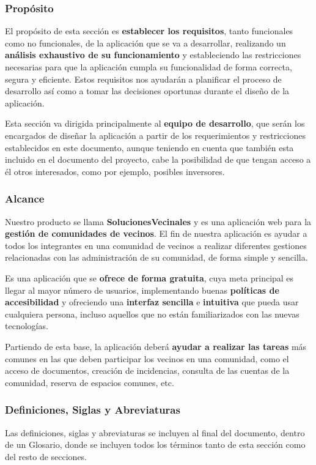 \subsubsection{Propósito}
El propósito de esta sección es \textbf{establecer los requisitos}, tanto funcionales como no funcionales, de la aplicación que se va a desarrollar, realizando un \textbf{análisis exhaustivo de su funcionamiento} y estableciendo las restricciones necesarias para que la aplicación cumpla su funcionalidad de forma correcta, segura y eficiente. Estos requisitos nos ayudarán a planificar el proceso de desarrollo así como a tomar las decisiones oportunas durante el diseño de la aplicación.

Esta sección va dirigida principalmente al \textbf{equipo de desarrollo}, que serán los encargados de diseñar la aplicación a partir de los requerimientos y restricciones establecidos en este documento, aunque teniendo en cuenta que también esta incluido en el documento del proyecto, cabe la posibilidad de que tengan acceso a él otros interesados, como por ejemplo, posibles inversores.

\subsubsection{Alcance}
Nuestro producto se llama \textbf{SolucionesVecinales} y es una aplicación web para la \textbf{gestión de comunidades de vecinos}. El fin de nuestra aplicación es ayudar a todos los integrantes en una comunidad de vecinos a realizar diferentes gestiones relacionadas con las administración de su comunidad, de forma simple y sencilla. 

Es una aplicación que se \textbf{ofrece de forma gratuita}, cuya meta principal es llegar al mayor número de usuarios, implementando buenas \textbf{políticas de accesibilidad} y ofreciendo una \textbf{interfaz sencilla} e \textbf{intuitiva} que pueda usar cualquiera persona, incluso aquellos que no están familiarizados con las nuevas tecnologías. 

Partiendo de esta base, la aplicación deberá \textbf{ayudar a realizar las tareas} más comunes en las que deben participar los vecinos en una comunidad, como el acceso de documentos, creación de incidencias, consulta de las cuentas de la comunidad,  reserva de espacios comunes, etc.

\subsubsection{Definiciones, Siglas y Abreviaturas}
Las definiciones, siglas y abreviaturas se incluyen al final del documento, dentro de un Glosario, donde se incluyen todos los términos tanto de esta sección como del resto de secciones.

